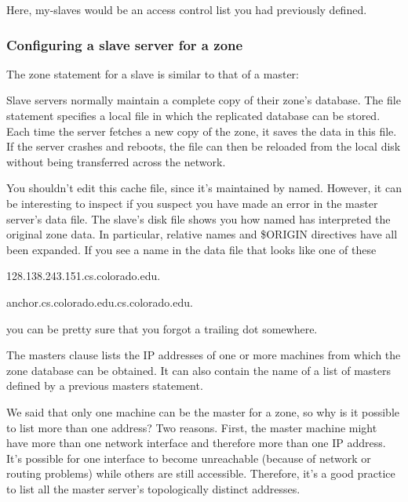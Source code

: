 
Here, {my-slaves} would be an access control list you had previously
defined.

\subsubsection[Configuring a slave server for a
zone]{\texorpdfstring{\protect\hypertarget{part0024_split_044.htmlux5cux23_idTextAnchor914}{}{}Configuring
a slave server for a zone}{Configuring a slave server for a zone}}

\protect\hypertarget{part0024_split_044.htmlux5cux23_idIndexMarker2187}{}{}\protect\hypertarget{part0024_split_044.htmlux5cux23_idIndexMarker2188}{}{}The
{zone} statement for a slave is similar to that of a master:


Slave servers normally maintain a complete copy of their zone's
database. The {file} statement specifies a local file in which the
replicated database can be stored. Each time the server fetches a new
copy of the zone, it saves the data in this file. If the server crashes
and reboots, the file can then be reloaded from the local disk without
being transferred across the network.

You shouldn't edit this cache file, since it's maintained by {named}.
However, it can be interesting to inspect if you suspect you have made
an error in the master server's data file. The slave's disk file shows
you how {named} has interpreted the original zone data. In particular,
relative names and
\protect\hypertarget{part0024_split_044.htmlux5cux23_idIndexMarker2189}{}{}{\$ORIGIN}
directives have all been expanded. If you see a name in the data file
that looks like one of these

{}128.138.243.151.cs.colorado.edu.

{}anchor.cs.colorado.edu.cs.colorado.edu.

you can be pretty sure that you forgot a trailing dot somewhere.

The {masters} clause lists the IP addresses of one or more machines from
which the zone database can be obtained. It can also contain the name of
a list of masters defined by a previous {masters} statement.

\protect\hypertarget{part0024_split_044.htmlux5cux23_idTextAnchor915}{}{}We
said that only one machine can be the master for a zone, so why is it
possible to list more than one address? Two reasons. First, the master
machine might have more than one network interface and therefore more
than one IP address. It's possible for one interface to become
unreachable (because of network or routing problems) while others are
still accessible. Therefore, it's a good practice to list all the master
server's topologically distinct addresses.

